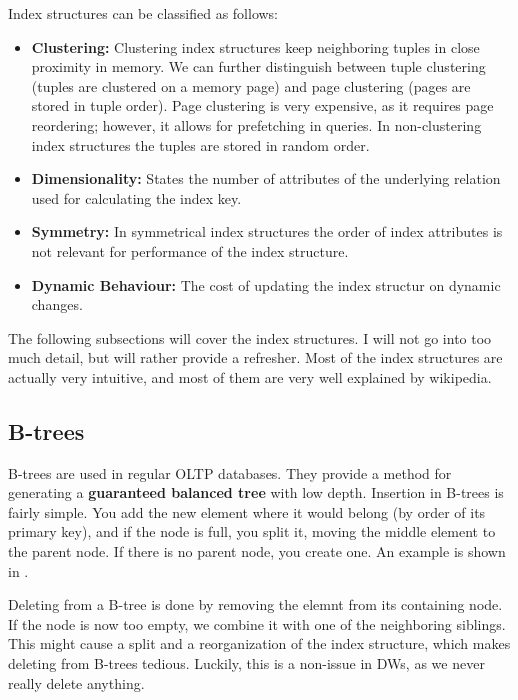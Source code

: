 \documentclass{article}
\begin{document}
Index structures can be classified as follows:
\begin{itemize}
    \item \textbf{Clustering:} Clustering index structures keep neighboring tuples in close proximity in memory.
        We can further distinguish between tuple clustering (tuples are clustered on a memory page) and page clustering (pages are stored in tuple order).
        Page clustering is very expensive, as it requires page reordering; however, it allows for prefetching in queries.
        In non-clustering index structures the tuples are stored in random order.
    \item \textbf{Dimensionality:} States the number of attributes of the underlying relation used for calculating the index key.
    \item \textbf{Symmetry:} In symmetrical index structures the order of index attributes is not relevant for performance of the index structure.
    \item \textbf{Dynamic Behaviour:} The cost of updating the index structur on dynamic changes.
\end{itemize}

The following subsections will cover the index structures.
I will not go into too much detail, but will rather provide a refresher.
Most of the index structures are actually very intuitive, and most of them are very well explained by wikipedia.

\subsection{B-trees}
B-trees are used in regular OLTP databases.
They provide a method for generating a \textbf{guaranteed balanced tree} with low depth.
Insertion in B-trees is fairly simple.
You add the new element where it would belong (by order of its primary key), and if the node is full, you split it, moving the middle element to the parent node.
If there is no parent node, you create one.
An example is shown in .

Deleting from a B-tree is done by removing the elemnt from its containing node.
If the node is now too empty, we combine it with one of the neighboring siblings.
This might cause a split and a reorganization of the index structure, which makes deleting from B-trees tedious.
Luckily, this is a non-issue in DWs, as we never really delete anything.
\end{document}
